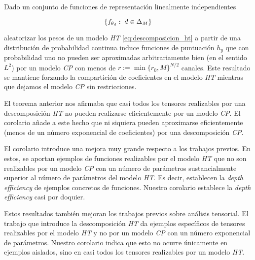 \begin{corolario} \label{corol:corol_principal}

    Dado un conjunto de funciones de representación linealmente independientes

    \begin{equation}
        \{ f_{\theta_d}: \; d \in \Delta_{M} \}
    \end{equation}

     aleatorizar los pesos de un modelo \textit{HT} \eqref{eq:descomposicion_ht} a partir de una distribución de probabilidad continua induce funciones de puntuación $h_y$ que con probabilidad uno no pueden ser aproximadas arbitrariamente bien (en el sentido $L^2$) por un modelo \textit{CP} con menos de $r := \min \{r_0, M \}^{N/2}$ canales. Este resultado se mantiene forzando la compartición de coeficientes en el modelo \textit{HT} mientras que dejamos el modelo \textit{CP} sin restricciones.

\end{corolario}

El teorema anterior nos afirmaba que casi todos los tensores realizables por una descomposición \textit{HT} no pueden realizarse eficientemente por un modelo \textit{CP}. El corolario añade a este hecho que ni siquiera pueden aproximarse eficientemente (menos de un número exponencial de coeficientes) por una descomposición \textit{CP}.

El corolario  introduce una mejora muy grande respecto a los trabajos previos. En estos, se aportan ejemplos de funciones realizables por el modelo \textit{HT} que no son realizables por un modelo \textit{CP} con un número de parámetros sustancialmente superior al número de parámetros del modelo \textit{HT}. Es decir, establecen la \textit{depth efficiency} de ejemplos concretos de funciones. Nuestro corolario establece la \textit{depth efficiency} casi por doquier.

Estos resultados también mejoran los trabajos previos sobre análisis tensorial. El trabajo que introduce la descomposición \textit{HT} \cite{matematicas:descomposicion_ht} da ejemplos específicos de tensores realizables por el modelo \textit{HT} y no por un modelo \textit{CP} con un número exponencial de parámetros. Nuestro corolario indica que esto no ocurre únicamente en ejemplos aislados, sino en casi todos los tensores realizables por un modelo \textit{HT}.


